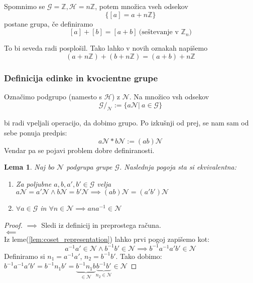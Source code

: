 \documentclass[a4paper]{article}
\newtheorem{lemma}{Lema}
\begin{document}
Spomnimo se $\mathcal{G} = \mathbb{Z}, \mathcal{H} = n\mathbb{Z}$, potem množica vseh odsekov $$\{ [a] = a + n\mathbb{Z}\}$$ postane grupa, če definiramo $$[a] + [b] = [a+b] \ \text{(seštevanje v $\mathbb{Z}_n$)}$$

To bi seveda radi posplošil. Tako lahko v novih oznakah napišemo $$(a + n\mathbb{Z}) + (b + n\mathbb{Z}) = (a + b) + n\mathbb{Z}$$


\subsubsection{Definicija edinke in kvocientne grupe}

Označimo podgrupo (namesto s $\mathcal{H}$) z $\mathcal{N}$. Na množico vsh odsekov
\begin{equation}
\label{eq:def_all_cosets}
\mathcal{G}/_{\mathcal{N}} := \{ a\mathcal{N} | \ a \in \mathcal{G} \}
\end{equation}

bi radi vpeljali operacijo, da dobimo grupo. Po izkušnji od prej, se nam sam od sebe ponuja predpis:
$$a\mathcal{N} * b\mathcal{N} := (ab) \mathcal{N}$$
Vendar pa se pojavi problem dobre definiranosti.

\begin{lemma}
Naj bo $\mathcal{N}$ podgrupa grupe $\mathcal{G}$. Naslednja pogoja sta si ekvivalentna:
\begin{enumerate}
\item Za poljubne $a,b, a', b' \in \mathcal{G}$ velja $a\mathcal{N} = a'\mathcal{N} \land b\mathcal{N} = b'\mathcal{N} \implies (ab) \mathcal{N} = (a'b')\mathcal{N}$
\item $\forall a \in \mathcal{G}$ in $\forall n \in \mathcal{N} \implies ana^{-1} \in \mathcal{N}$
\end{enumerate}
\end{lemma}

\begin{proof}
$\implies$ Sledi iz definicij in preprostega računa.\\
$\impliedby$\\
Iz leme(\ref{lem:coset_representation}) lahko prvi pogoj zapišemo kot:
$$a^{-1}a' \in \mathcal{N} \land b^{-1}b' \in \mathcal{N} \implies b^{-1}a^{-1}a'b' \in \mathcal{N}$$
Definiramo si $n_1 = a^{-1}a'$, $n_2 = b^{-1}b'$. Tako dobimo:\\
$b^{-1}a^{-1}a'b' = b^{-1}n_1b' = \underbrace{b^{-1}n_1b}_{\in \mathcal{N}}\underbrace{b^{-1}b'}_{n_2 \in \mathcal{N}} \in \mathcal{N}$
\end{proof}
\end{document}
